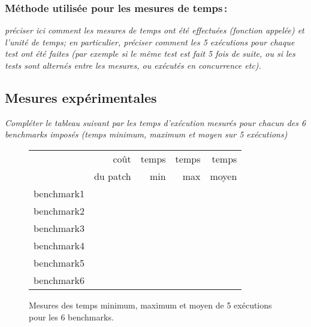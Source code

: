 \documentclass[a4paper, 10pt, english]{article}
\begin{document}
    \subsubsection{Méthode utilisée pour les mesures de temps\,: } 
      {\em préciser ici  comment les mesures de temps ont été effectuées (fonction appelée) et l'unité de temps; en particulier, 
       préciser comment les 5 exécutions pour chaque test ont été faites (par exemple si le même test est fait 5 fois de suite, ou si les tests sont alternés entre
       les mesures, ou exécutés en concurrence etc). 
      }

  \subsection{Mesures expérimentales}
    {\em Compléter le tableau suivant par les temps d'exécution mesurés pour chacun des 6 benchmarks imposés
              (temps minimum, maximum et moyen sur 5 exécutions)
    }

    \begin{figure}[h]
      \begin{center}
        \begin{tabular}{|l||r||r|r|r||}
          \hline
          \hline
            & coût         & temps     & temps   & temps \\
            & du patch     & min       & max     & moyen \\
          \hline
          \hline
            benchmark1 &      &     &     &     \\
          \hline
            benchmark2 &      &     &     &     \\
          \hline
            benchmark3 &      &     &     &     \\
          \hline
            benchmark4 &      &     &     &     \\
          \hline
            benchmark5 &      &     &     &     \\
          \hline
            benchmark6 &      &     &     &     \\
          \hline
          \hline
        \end{tabular}
        \caption{Mesures des temps minimum, maximum et moyen de 5 exécutions pour les 6 benchmarks.}
        \label{table-temps}
      \end{center}
    \end{figure}
\end{document}

